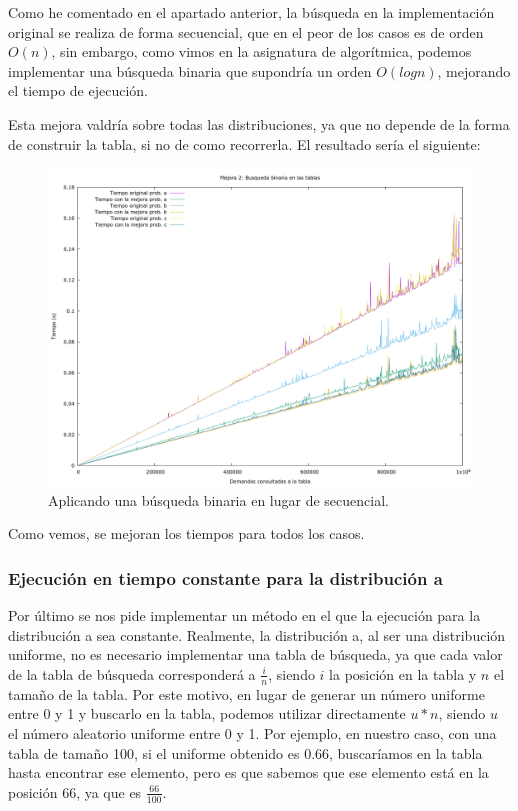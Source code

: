 \documentclass[12pt, spanish]{article}
\begin{document}
Como he comentado en el apartado anterior, la búsqueda en la implementación original se realiza de forma secuencial, que en el peor de los casos es de orden $O(n)$, sin embargo, como vimos en la asignatura de algorítmica, podemos implementar una búsqueda binaria que supondría un orden $O(log n)$, mejorando el tiempo de ejecución.

Esta mejora valdría sobre todas las distribuciones, ya que no depende de la forma de construir la tabla, si no de como recorrerla. El resultado sería el siguiente:

\begin{figure}[H]
	\centering
	\includegraphics[scale = 0.2]{t_mejora2.png}
	\caption{Aplicando una búsqueda binaria en lugar de secuencial.}
	\label{fig:ej1_a_150000}

\end{figure}

Como vemos, se mejoran los tiempos para todos los casos.

\subsubsection{Ejecución en tiempo constante para la distribución a}

Por último se nos pide implementar un método en el que la ejecución para la distribución a sea constante. Realmente, la distribución a, al ser una distribución uniforme, no es necesario implementar una tabla de búsqueda, ya que cada valor de la tabla de búsqueda corresponderá a $\frac{i}{n}$, siendo $i$ la posición en la tabla y $n$ el tamaño de la tabla. Por este motivo, en lugar de generar un número uniforme entre 0 y 1 y buscarlo en la tabla, podemos utilizar directamente $u * n$, siendo $u$ el número aleatorio uniforme entre 0 y 1. Por ejemplo, en nuestro caso, con una tabla de tamaño 100, si el uniforme obtenido es 0.66, buscaríamos en la tabla hasta encontrar ese elemento, pero es que sabemos que ese elemento está en la posición 66, ya que es $\frac{66}{100}$.
\end{document}
